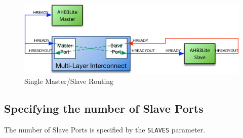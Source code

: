 \begin{figure}[htb]
	\centering
	\includegraphics[]{assets/img/ahb-lite-switch-sys5}
	\caption{Single Master/Slave Routing}
	\label{fig:master-slave-routing}
\end{figure}

\subsection{Specifying the number of Slave
Ports}\label{specifying-the-number-of-slave-ports}

The number of Slave Ports is specified by the \texttt{SLAVES} parameter.
